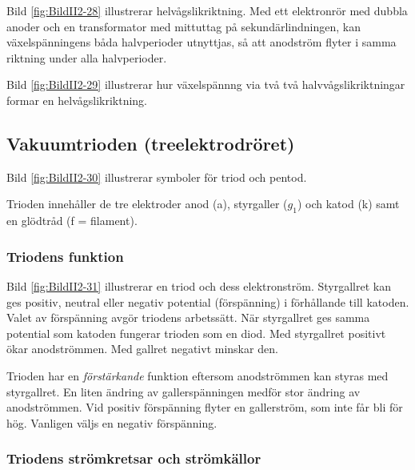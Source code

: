 Bild \ref{fig:BildII2-28} illustrerar helvågslikriktning.
Med ett elektronrör med dubbla anoder och en transformator med mittuttag på
sekundärlindningen, kan växelspänningens båda halvperioder utnyttjas, så att
anodström flyter i samma riktning under alla halvperioder.


Bild \ref{fig:BildII2-29} illustrerar hur växelspännng via två
två halvvågslikriktningar formar en helvågslikriktning.

\subsection{Vakuumtrioden (treelektrodröret)}


Bild \ref{fig:BildII2-30} illustrerar symboler för triod och pentod.

Trioden innehåller de tre elektroder anod (a), styrgaller (\(g_1\)) och katod
(k) samt en glödtråd (f = filament).

\subsubsection{Triodens funktion}

Bild \ref{fig:BildII2-31} illustrerar en triod och dess elektronström.
Styrgallret kan ges positiv, neutral eller negativ potential (förspänning) i
förhållande till katoden.
Valet av förspänning avgör triodens arbetssätt.
När styrgallret ges samma potential som katoden fungerar trioden som en diod.
Med styrgallret positivt ökar anodströmmen.
Med gallret negativt minskar den.

Trioden har en \emph{förstärkande} funktion eftersom anodströmmen kan styras med
styrgallret. En liten ändring av gallerspänningen medför stor ändring av anodströmmen.
Vid positiv förspänning flyter en gallerström, som inte får bli för hög.
Vanligen väljs en negativ förspänning.


\subsubsection{Triodens strömkretsar och strömkällor}

